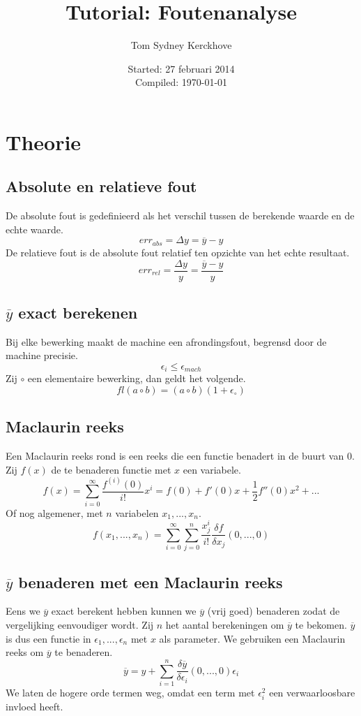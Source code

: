 \documentclass[10pt,a4paper]{article}
\author{Tom Sydney Kerckhove}
\title{Tutorial: Foutenanalyse}
\date{Started: 27 februari 2014\\ Compiled: \today}
\begin{document}
\maketitle
\tableofcontents
\pagebreak

\section{Theorie}
\subsection{Absolute en relatieve fout}
De absolute fout is gedefinieerd als het verschil tussen de berekende waarde en de echte waarde.
\[
err_{abs} = \Delta y = \overline{y} - y
\]
De relatieve fout is de absolute fout relatief ten opzichte van het echte resultaat.
\[
err_{rel} = \frac{\Delta y}{y} = \frac{\overline{y} - y}{y}
\]

\subsection{$\overline{y}$ exact berekenen}
Bij elke bewerking maakt de machine een afrondingsfout, begrensd door de machine precisie.
\[
\epsilon_i \le \epsilon_{mach}
\]
Zij $\circ$ een elementaire bewerking, dan geldt het volgende.
\[
fl(a\circ b) = (a\circ b)(1+\epsilon_{\circ})
\]

\subsection{Maclaurin reeks}
Een Maclaurin reeks rond is een reeks die een functie benadert in de buurt van $0$. Zij $f(x)$ de te benaderen functie met $x$ een variabele.
\[
f(x) = \sum_{i=0}^\infty\frac{f^{(i)}(0)}{i!}x^i = f(0) + f'(0)x + \frac{1}{2}f''(0)x^2 + ...
\]
Of nog algemener, met $n$ variabelen $x_1,...,x_n$.
\[
f(x_1,...,x_n) = \sum_{i=0}^\infty\sum_{j=0}^{n}\frac{x_j^i}{i!}\frac{\delta f}{\delta x_j}(0,...,0)
\]

\subsection{$\overline{y}$ benaderen met een Maclaurin reeks}
Eens we $\overline{y}$ exact berekent hebben kunnen we $\overline{y}$ (vrij goed) benaderen zodat de vergelijking eenvoudiger wordt. Zij $n$ het aantal berekeningen om $\overline{y}$ te bekomen. $\overline{y}$ is dus een functie in $\epsilon_1,...,\epsilon_n$ met $x$ als parameter. We gebruiken een Maclaurin reeks om $\overline{y}$ te benaderen.
\[
\overline{y} = y + \sum_{i=1}^{n}\frac{\delta\overline{y}}{\delta\epsilon_i}(0,...,0)\epsilon_i
\]
We laten de hogere orde termen weg, omdat een term met $\epsilon_{i}^2$ een verwaarloosbare invloed heeft. 
\end{document}
